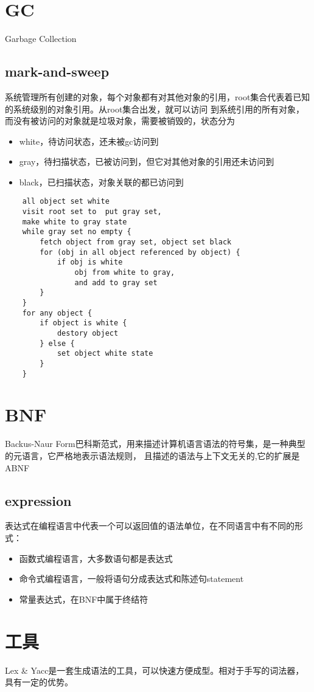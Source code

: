 \section{GC}

Garbage Collection

\subsection{mark-and-sweep}
系统管理所有创建的对象，每个对象都有对其他对象的引用，root集合代表着已知的系统级别的对象引用。从root集合出发，就可以访问
到系统引用的所有对象，而没有被访问的对象就是垃圾对象，需要被销毁的，状态分为
\begin{itemize}
    \item {white，待访问状态，还未被gc访问到}
    \item {gray，待扫描状态，已被访问到，但它对其他对象的引用还未访问到}
    \item {black，已扫描状态，对象关联的都已访问到}
\end{itemize}
\begin{lstlisting}
    all object set white
    visit root set to  put gray set,
    make white to gray state 
    while gray set no empty {
        fetch object from gray set, object set black 
        for (obj in all object referenced by object) {
            if obj is white 
                obj from white to gray, 
                and add to gray set 
        }
    }
    for any object {
        if object is white {
            destory object 
        } else {
            set object white state
        }
    }
\end{lstlisting}

\section{BNF}
Backus-Naur Form巴科斯范式，用来描述计算机语言语法的符号集，是一种典型的元语言，它严格地表示语法规则，
且描述的语法与上下文无关的,它的扩展是ABNF 
\cite{ABNF}

\subsection{expression}
表达式在编程语言中代表一个可以返回值的语法单位，在不同语言中有不同的形式：
\begin{itemize}
    \item {函数式编程语言，大多数语句都是表达式}
    \item {命令式编程语言，一般将语句分成表达式和陈述句statement}
    \item {常量表达式，在BNF中属于终结符}
\end{itemize}

\section{工具}
Lex \& Yacc是一套生成语法的工具，可以快速方便成型。相对于手写的词法器，具有一定的优势。

